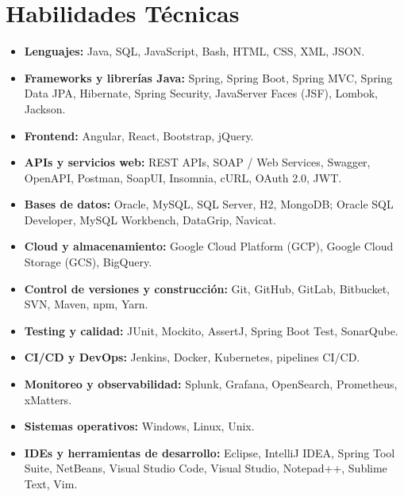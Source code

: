 \documentclass[10pt,letterpaper]{article}
\begin{document}
\section{Habilidades Técnicas}

\begin{itemize}

    \item \textbf{Lenguajes:}
    Java, SQL, JavaScript, Bash, HTML, CSS, XML, JSON.

    \item \textbf{Frameworks y librerías Java:}
    Spring, Spring Boot, Spring MVC, Spring Data JPA, Hibernate,
    Spring Security, JavaServer Faces (JSF), Lombok, Jackson.

    \item \textbf{Frontend:}
    Angular, React, Bootstrap, jQuery.

    \item \textbf{APIs y servicios web:}
    REST APIs, SOAP / Web Services, Swagger, OpenAPI,
    Postman, SoapUI, Insomnia, cURL, OAuth 2.0, JWT.

    \item \textbf{Bases de datos:}
    Oracle, MySQL, SQL Server, H2, MongoDB;
    Oracle SQL Developer, MySQL Workbench, DataGrip, Navicat.

    \item \textbf{Cloud y almacenamiento:}
    Google Cloud Platform (GCP), Google Cloud Storage (GCS), BigQuery.

    \item \textbf{Control de versiones y construcción:}
    Git, GitHub, GitLab, Bitbucket, SVN, Maven, npm, Yarn.

    \item \textbf{Testing y calidad:}
    JUnit, Mockito, AssertJ, Spring Boot Test, SonarQube.

    \item \textbf{CI/CD y DevOps:}
    Jenkins, Docker, Kubernetes, pipelines CI/CD.

    \item \textbf{Monitoreo y observabilidad:}
    Splunk, Grafana, OpenSearch, Prometheus, xMatters.

    \item \textbf{Sistemas operativos:}
    Windows, Linux, Unix.

    \item \textbf{IDEs y herramientas de desarrollo:}
    Eclipse, IntelliJ IDEA, Spring Tool Suite, NetBeans,
    Visual Studio Code, Visual Studio, Notepad++, Sublime Text, Vim.


\end{itemize}
\end{document}
